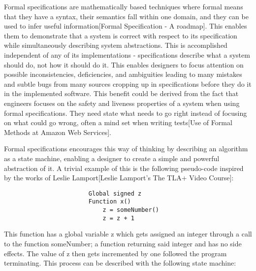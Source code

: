 \documentclass{article}
\begin{document}
Formal specifications are mathematically based techniques where formal means that they have a syntax, their semantics fall within one domain, and they can be used to infer useful information[Formal Specification - A roadmap]. This enables them to demonstrate that a system is correct with respect to its specification while simultaneously describing system abstractions. This is accomplished independent of any of its implementations - specifications describe what a system should do, not how it should do it. This enables designers to focus attention on possible inconsistencies, deficiencies, and ambiguities leading to many mistakes and subtle bugs from many sources cropping up in specifications before they do it in the implemented software. This benefit could be derived from the fact that engineers focuses on the safety and liveness properties of a system when using formal specifications. They need state what needs to go right instead of focusing on what could go wrong, often a mind set when writing tests[Use of Formal Methods at Amazon Web Services]. 

Formal specifications encourages this way of thinking by describing an algorithm as a state machine, enabling a designer to create a simple and powerful abstraction of it. A trivial example of this is the following pseudo-code inspired by the works of Leslie Lamport[Leslie Lamport's The TLA+ Video Course]:

\begin{verbatim}
                        Global signed z
                        Function x()
                        	z = someNumber()
                        	z = z + 1

\end{verbatim}

This function has a global variable z which gets assigned an integer through a call to the function someNumber; a function returning said integer and has no side effects. The value of z then gets incremented by one followed the program terminating. This process can be described with the following state machine:
\end{document}
